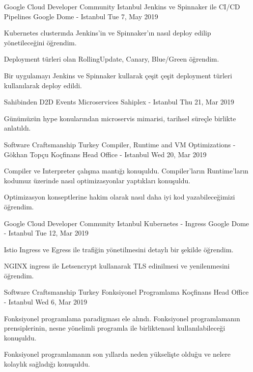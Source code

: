 \begin{cventries}
    \cventry
    {Google Cloud Developer Community Istanbul}
    {Jenkins ve Spinnaker ile CI/CD Pipelines}
    {Google Dome - Istanbul}
    {Tue 7, May 2019}
    {
      \begin{cvitems}
        \item{Kubernetes clusterında Jenkins'in ve Spinnaker'ın nasıl deploy edilip yönetileceğini öğrendim.}
        \item{Deployment türleri olan RollingUpdate, Canary, Blue/Green öğrendim.}
        \item{Bir uygulamayı Jenkins ve Spinnaker kullarak çeşit çeşit deployment türleri kullanılarak deploy edildi.}
      \end{cvitems}
    }
    
    \cventry
    {Sahibinden D2D Events}
    {Microservices}
    {Sahiplex - Istanbul}
    {Thu 21, Mar 2019}
    {
      \begin{cvitems}
        \item{Günümüzün hype konularından microservis mimarisi, tarihsel süreçle birlikte anlatıldı.}
      \end{cvitems}
    }
    
    \cventry
    {Software Craftsmanship Turkey}
    {Compiler, Runtime and VM Optimizations - Gökhan Topçu}
    {Koçfinans Head Office - Istanbul}
    {Wed 20, Mar 2019}
    {
      \begin{cvitems}
        \item{Compiler ve Interpreter çalışma mantığı konuşuldu. Compiler'ların Runtime'ların kodumuz üzerinde nasıl optimizasyonlar yaptıkları konuşuldu.}
        \item{Optimizasyon konseptlerine hakim olarak nasıl daha iyi kod yazabileceğimizi öğrendim.}
      \end{cvitems}
    }
    
    \cventry
    {Google Cloud Developer Community Istanbul}
    {Kubernetes - Ingress}
    {Google Dome - Istanbul}
    {Tue 12, Mar 2019}
    {
      \begin{cvitems}
        \item{Istio Ingress ve Egress ile trafiğin yönetilmesini detaylı bir şekilde öğrendim.}
        \item{NGINX ingress ile Letsencrypt kullanarak TLS edinilmesi ve yenilenmesini öğrendim.}
      \end{cvitems}
    }
    
    \cventry
    {Software Craftsmanship Turkey}
    {Fonksiyonel Programlama}
    {Koçfinans Head Office - Istanbul}
    {Wed 6, Mar 2019}
    {
      \begin{cvitems}
        \item{Fonksiyonel programlama paradigması ele alındı. Fonksiyonel programlamanın prensiplerinin, nesne yönelimli programla ile birliktenasıl kullanılabileceği konuşuldu.}
        \item{Fonksiyonel programlamanın son yıllarda neden yükselişte olduğu ve nelere kolaylık sağladığı konuşuldu.}
      \end{cvitems}
    }
    

\end{cventries}
